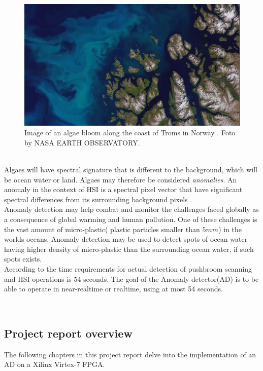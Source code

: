 \begin{figure}[H]
\centering
   \includegraphics[scale=0.3]{images/algaes/algaes_northern_troms.jpg}
  \caption{ Image of an algae bloom along the coast of Troms in Norway \cite{laksedeath}. Foto by NASA EARTH OBSERVATORY. } 
  \label{fig:algae_bloom_troms}
\end{figure}
\\

Algaes will have spectral signature that is different to the background, which will be ocean water or land. Algaes may therefore be considered \textit{anomalies}. An anomaly in the context of HSI is a spectral pixel vector that have significant spectral differences from its surrounding background pixels \cite{yang2015dual}.  
\\

Anomaly detection may help combat and monitor the challenges faced globally as a consequence of global warming and human pollution. One of these challenges is the vast amount of micro-plastic( plastic particles smaller than $5mm$) in the worlds oceans. Anomaly detection may be used to detect spots of ocean water having higher density of micro-plastic than the surrounding ocean water, if such spots exists.       \\


According to \cite{SmallSat_project_description} the time requirements for actual detection of pushbroom scanning and HSI operations is 54 seconds. The goal of the Anomaly detector(AD) is to be able to operate in near-realtime or realtime, using at most 54 seconds. 


\\






\newpage
\subsection{Project report overview}
The following chapters in this project report delve into the implementation of an AD on a Xilinx Virtex-7 FPGA. \\  

